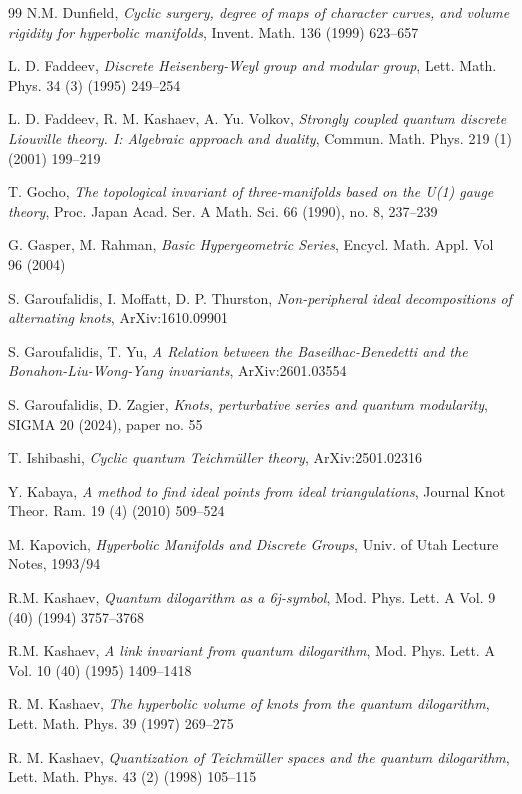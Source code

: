 \documentclass[11pt]{amsart}
\begin{document}
\begin{thebibliography}{99}
 N.M. Dunfield, \emph{Cyclic surgery, degree of maps of character curves, and volume rigidity for hyperbolic manifolds}, Invent. Math. 136 (1999) 623--657

 L. D. Faddeev, \emph{Discrete Heisenberg-Weyl group and modular group}, Lett. Math. Phys. 34 (3) (1995) 249--254

 L. D. Faddeev, R. M. Kashaev, A. Yu. Volkov, \emph{Strongly coupled quantum discrete Liouville theory. I: Algebraic approach and duality}, Commun. Math. Phys. 219 (1) (2001) 199--219

 T. Gocho, \emph{The topological invariant of three-manifolds based on the U(1) gauge theory}, Proc. Japan Acad. Ser. A Math. Sci. 66 (1990), no. 8, 237--239

 G. Gasper, M. Rahman, \emph{Basic Hypergeometric Series}, Encycl. Math. Appl. Vol 96 (2004)

 S. Garoufalidis, I. Moffatt, D. P. Thurston, \emph{Non-peripheral ideal decompositions of alternating knots}, ArXiv:1610.09901

 S. Garoufalidis, T. Yu, \emph{A Relation between the Baseilhac-Benedetti and the Bonahon-Liu-Wong-Yang invariants}, ArXiv:2601.03554 

 S. Garoufalidis, D. Zagier, {\it  Knots, perturbative series and quantum modularity},  SIGMA 20 (2024), paper no. 55

 T. Ishibashi, \emph{Cyclic quantum Teichm\"uller theory}, ArXiv:2501.02316

 Y. Kabaya,  \emph{A method to find ideal points from ideal triangulations}, Journal Knot Theor. Ram. 19 (4) (2010) 509--524 

 M. Kapovich, \emph{Hyperbolic Manifolds and Discrete Groups}, Univ. of Utah Lecture Notes, 1993/94

 R.M. Kashaev, \emph{Quantum dilogarithm as a 6j-symbol}, Mod. Phys. Lett. A Vol. 9 (40) (1994) 3757--3768

 R.M. Kashaev, \emph{A link invariant from quantum dilogarithm},  Mod. Phys. Lett. A Vol. 10 (40) (1995) 1409--1418

 R. M. Kashaev, {\it The hyperbolic volume of knots from the quantum dilogarithm}, Lett. Math. Phys. 39 (1997) 269--275

 R. M. Kashaev, {\it Quantization of Teichm\"uller spaces and the quantum dilogarithm}, Lett. Math. Phys. 43 (2) (1998) 105--115


\end{thebibliography}
\end{document}
